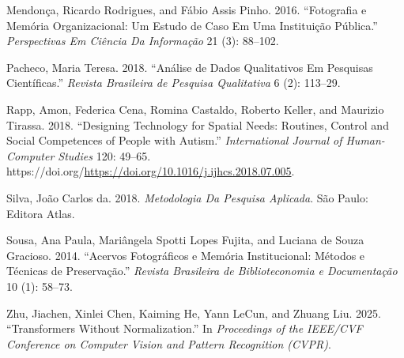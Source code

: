 \documentclass[
]{article}
\newlength{\cslhangindent}
\newenvironment{CSLReferences}[2] %
 {\begin{list}{}{%
  \setlength{\itemindent}{0pt}
  \setlength{\leftmargin}{0pt}
  \setlength{\parsep}{0pt}
  \ifodd #1
   \setlength{\leftmargin}{\cslhangindent}
   \setlength{\itemindent}{-1\cslhangindent}
  \fi
  \setlength{\itemsep}{#2\baselineskip}}}
 {\end{list}}
\begin{document}
\begin{CSLReferences}{1}{0}
Mendonça, Ricardo Rodrigues, and Fábio Assis Pinho. 2016. {``Fotografia
e Memória Organizacional: Um Estudo de Caso Em Uma Instituição
Pública.''} \emph{Perspectivas Em Ciência Da Informação} 21 (3):
88--102.

Pacheco, Maria Teresa. 2018. {``Análise de Dados Qualitativos Em
Pesquisas Científicas.''} \emph{Revista Brasileira de Pesquisa
Qualitativa} 6 (2): 113--29.

Rapp, Amon, Federica Cena, Romina Castaldo, Roberto Keller, and Maurizio
Tirassa. 2018. {``Designing Technology for Spatial Needs: Routines,
Control and Social Competences of People with Autism.''}
\emph{International Journal of Human-Computer Studies} 120: 49--65.
https://doi.org/\url{https://doi.org/10.1016/j.ijhcs.2018.07.005}.

Silva, João Carlos da. 2018. \emph{Metodologia Da Pesquisa Aplicada}.
São Paulo: Editora Atlas.

Sousa, Ana Paula, Mariângela Spotti Lopes Fujita, and Luciana de Souza
Gracioso. 2014. {``Acervos Fotográficos e Memória Institucional: Métodos
e Técnicas de Preservação.''} \emph{Revista Brasileira de
Biblioteconomia e Documentação} 10 (1): 58--73.

Zhu, Jiachen, Xinlei Chen, Kaiming He, Yann LeCun, and Zhuang Liu. 2025.
{``Transformers Without Normalization.''} In \emph{Proceedings of the
IEEE/CVF Conference on Computer Vision and Pattern Recognition (CVPR)}.

\end{CSLReferences}
\end{document}
